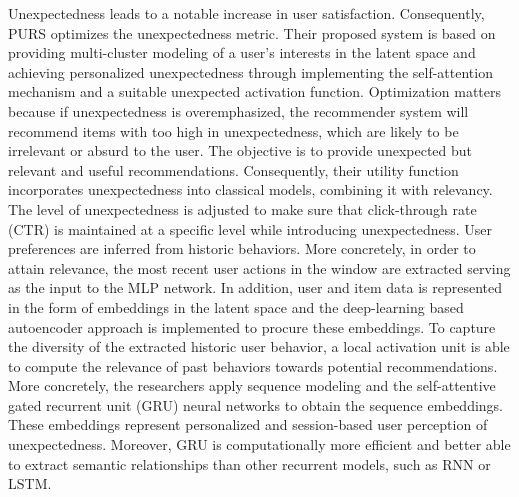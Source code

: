 Unexpectedness leads to a notable increase in user satisfaction. Consequently, PURS optimizes the unexpectedness metric. Their proposed system is based on providing multi-cluster modeling of a user’s interests in the latent space and achieving personalized unexpectedness through implementing the self-attention mechanism and a suitable unexpected activation function. Optimization matters because if unexpectedness is overemphasized, the recommender system will recommend items with too high in unexpectedness, which are likely to be irrelevant or absurd to the user. The objective is to provide unexpected but relevant and useful recommendations. Consequently, their utility function incorporates unexpectedness into classical models, combining it with relevancy. The level of unexpectedness is adjusted to make sure that click-through rate (CTR) is maintained at a specific level while introducing unexpectedness. 
User preferences are inferred from historic behaviors. More concretely, in order to attain relevance, the most recent user actions in the window are extracted serving as the input to the MLP network. In addition, user and item data is represented in the form of embeddings in the latent space and the deep-learning based autoencoder approach is implemented to procure these embeddings. 
To capture the diversity of the extracted historic user behavior,  a local activation unit is able to compute the relevance of past behaviors towards potential recommendations. More concretely, the researchers apply sequence modeling and the self-attentive gated recurrent unit (GRU) neural networks to obtain the sequence embeddings. These embeddings represent personalized and session-based user perception of unexpectedness. Moreover, GRU is computationally more efficient and better able to extract semantic relationships than other recurrent models, such as RNN or LSTM.
